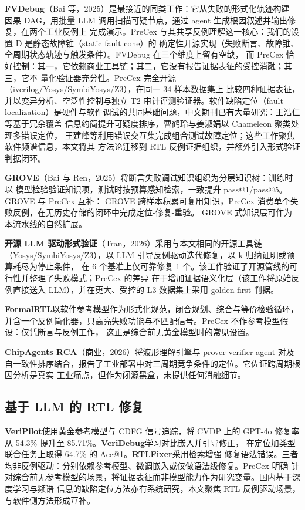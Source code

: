 \documentclass[twocolumn,10pt]{ctexart}
\begin{document}
\textbf{FVDebug}（Bai 等，2025）\cite{fvdebug}是最接近的同类工作：它从失败的形式化轨迹构建
因果 DAG，用批量 LLM 调用扫描可疑节点，通过 agent 生成根因叙述并输出修复，在两个工业反例上
完成演示。PreCex 与其共享反例理解这一核心：我们的设置 D 是静态故障锥（static fault cone）的
确定性开源实现（失败断言、故障锥、全周期状态轨迹与触发条件）。FVDebug 在三个维度上留有空缺，
而 PreCex 恰好控制：其一，它依赖商业工具链；其二，它没有报告证据表征的受控消融；其三，它不
量化验证器充分性。PreCex 完全开源（iverilog/Yosys/SymbiYosys/Z3），在同一 34 样本数据集上
比较四种证据表征，并以变异分析、空泛性控制与独立 T2 审计评测验证器。软件缺陷定位（fault
localization）是硬件与软件调试的共同基础问题，中文期刊已有大量研究：王浩仁等基于冗余覆盖
信息约简提升可疑度排序\cite{zh1}，曹鹤玲与姜淑娟以 Chameleon 聚类处理多错误定位\cite{zh2}，
王建峰等利用错误交互集完成组合测试故障定位\cite{zh3}；这些工作聚焦软件频谱信息，本文将其
方法论迁移到 RTL 反例证据组织，并额外引入形式验证判据闭环。

\textbf{GROVE}（Bai 与 Ren，2025）\cite{grove}将断言失败调试知识组织为分层知识树：训练时以
模型检验验证知识项，测试时按预算感知检索，一致提升 pass@1/pass@5。GROVE 与 PreCex 互补：
GROVE 跨样本积累可复用知识，PreCex 消费单个失败反例，在无历史存储的闭环中完成定位-修复-重验。
GROVE 式知识层可作为本流水线的自然扩展。

\textbf{开源 LLM 驱动形式验证}（Tran，2026）\cite{openllmformal}采用与本文相同的开源工具链
（Yosys/SymbiYosys/Z3），以 LLM 引导反例驱动迭代修复，以 k-归纳证明或预算耗尽为停止条件，
在 6 个基准上仅可靠修复 1 个。该工作验证了开源管线的可行性并整理了失败模式；PreCex 的差异
在于增加证据语义化层（该工作将原始反例直接送入 LLM），并在更大、受控的 L3 数据集上采用
golden-first 判据。

\textbf{FormalRTL}\cite{formalrtl}以软件参考模型作为形式化规范，闭合规划、综合与等价检验循环，
并含一个反例简化器，只高亮失败功能与不匹配信号。PreCex 不作参考模型假设：仅凭断言与反例工作，
这正是综合前无黄金模型时的常见设置。

\textbf{ChipAgents RCA}（商业，2026）\cite{chipagents}将波形理解引擎与 prover-verifier agent
对及自一致性排序结合，报告了工业部署中对三周期竞争条件的定位。它佐证跨周期根因分析是真实
工业痛点，但作为闭源黑盒，未提供任何消融细节。

\subsection{基于 LLM 的 RTL 修复}

\textbf{VeriPilot}\cite{veripilot}使用黄金参考模型与 CDFG 信号追踪，将 CVDP 上的 GPT-4o
修复率从 54.3\% 提升至 85.71\%。\textbf{VeriDebug}\cite{veridebug}学习对比嵌入并引导修正，
在定位加类型联合任务上取得 64.7\% 的 Acc@1。\textbf{RTLFixer}\cite{rtlfixer}采用检索增强
修复语法错误。三者均非反例驱动：分别依赖参考模型、微调嵌入或仅做语法级修复。PreCex 明确
针对综合前无参考模型的场景，将证据表征而非模型能力作为研究变量。国内基于深度学习与频谱
信息的缺陷定位方法亦有系统研究\cite{zh5}，本文聚焦 RTL 反例驱动场景，与软件侧方法形成互补。
\end{document}

